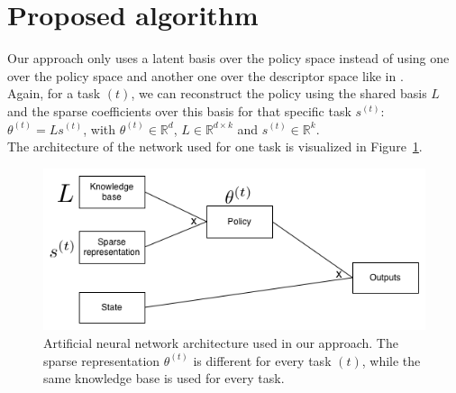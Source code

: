 \section{Proposed algorithm}
\label{sec:proposed_algorithm} %
Our approach only uses a latent basis over the policy space instead of using one over the policy space and another one over the descriptor space like in \cite{Isele2016UsingLearning}.\\
Again, for a task $(t)$, we can reconstruct the policy using the shared basis $L$ and the sparse coefficients over this basis for that specific task $s^{(t)}$: $\theta^{(t)} = Ls^{(t)}$, with $\theta^{(t)} \in \mathbb{R}^d$, $L \in \mathbb{R}^{d \times k}$ and $s^{(t)} \in \mathbb{R}^k$.\\
The architecture of the network used for one task is visualized in Figure~\ref{fig:algonn}.
\begin{figure}[htb]
    \centering
    \includegraphics[width=\linewidth]{images/knowledge_transfer.png}
    \caption[Artificial neural network architecture used in our approach]{Artificial neural network architecture used in our approach. The sparse representation $\theta^{(t)}$ is different for every task $(t)$, while the same knowledge base is used for every task.}
    \label{fig:algonn}
\end{figure}

